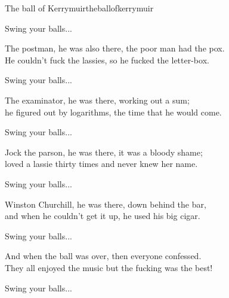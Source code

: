 \begin{song}{The ball of Kerrymuir}{theballofkerrymuir}
\begin{vers}
\end{vers}
\begin{vers}
Swing your balls...\\
\end{vers}
\begin{vers}
The postman, he was also there, the poor man had the pox.\\
He couldn't fuck the lassies, so he fucked the letter-box.\\
\end{vers}
\begin{vers}
Swing your balls...\\
\end{vers}
\begin{vers}
The examinator, he was there, working out a sum;\\
he figured out by logarithms, the time that he would come.\\
\end{vers}
\begin{vers}
Swing your balls...\\
\end{vers}
\begin{vers}
Jock the parson, he was there, it was a bloody shame;\\
loved a lassie thirty times and never knew her name.\\
\end{vers}
\begin{vers}
Swing your balls...\\
\end{vers}
\begin{vers}
Winston Churchill, he was there, down behind the bar,\\
and when he couldn't get it up, he used his big cigar.\\
\end{vers}
\begin{vers}
Swing your balls...\\
\end{vers}
\begin{vers}
And when the ball was over, then everyone confessed.\\
They all enjoyed the music but the fucking was the best!\\
\end{vers}
\begin{vers}
Swing your balls...\\
\end{vers}
\end{song}

